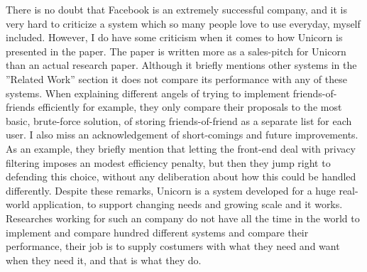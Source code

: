 \documentclass{article}
\begin{document}
\noindent There is no doubt that Facebook is an extremely successful company, and it is very hard to criticize a system which so many people love to use everyday, myself included. However, I do have some criticism when it comes to how Unicorn is presented in the paper. The paper is written more as a sales-pitch for Unicorn than an actual research paper. Although it briefly mentions other systems in the ''Related Work'' section it does not compare its performance with any of these systems. When explaining different angels of trying to implement friends-of-friends efficiently for example, they only compare their proposals to the most basic, brute-force solution, of storing friends-of-friend as a separate list for each user. I also miss an acknowledgement of short-comings and future improvements. As an example, they briefly mention that letting the front-end deal with privacy filtering imposes an modest efficiency penalty, but then they jump right to defending this choice, without any deliberation about how this could be handled differently. Despite these remarks, Unicorn is a system developed for a huge real-world application, to support changing needs and growing scale and it works. Researches working for such an company do not have all the time in the world to implement and compare hundred different systems and compare their performance, their job is to supply costumers with what they need and want when they need it, and that is what they do.
\end{document}
